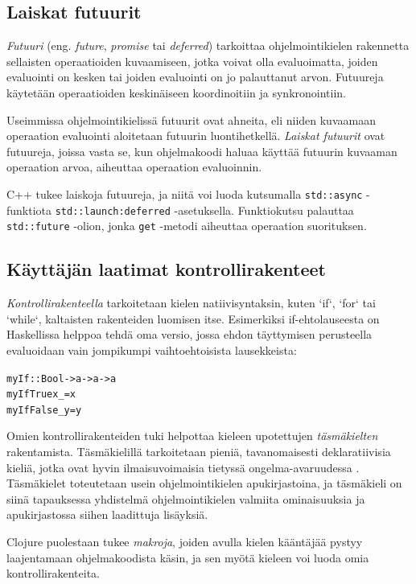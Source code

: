 \subsection{Laiskat futuurit}
\textit{Futuuri} (eng. \textit{future}, \textit{promise} tai \textit{deferred}) tarkoittaa ohjelmointikielen rakennetta sellaisten operaatioiden kuvaamiseen, jotka voivat olla evaluoimatta, joiden evaluointi on kesken tai joiden evaluointi on jo palauttanut arvon. Futuureja käytetään operaatioiden keskinäiseen koordinoitiin ja synkronointiin.

Useimmissa ohjelmointikielissä futuurit ovat ahneita, eli niiden kuvaamaan operaation evaluointi aloitetaan futuurin luontihetkellä. \textit{Laiskat futuurit} ovat futuureja, joissa vasta se, kun ohjelmakoodi haluaa käyttää futuurin kuvaaman operaation arvoa, aiheuttaa operaation evaluoinnin.

C++ tukee laiskoja futuureja, ja niitä voi luoda kutsumalla \verb!std::async! -funktiota \verb!std::launch:deferred! -asetuksella. Funktiokutsu palauttaa \verb!std::future! -olion, jonka \verb!get! -metodi aiheuttaa operaation suorituksen.

\subsection{Käyttäjän laatimat kontrollirakenteet}

\textit{Kontrollirakenteella} tarkoitetaan kielen natiivisyntaksin, kuten `if`, `for` tai `while`, kaltaisten rakenteiden luomisen itse. Esimerkiksi if-ehtolauseesta on Haskellissa helppoa tehdä oma versio, jossa ehdon täyttymisen perusteella evaluoidaan vain jompikumpi vaihtoehtoisista lausekkeista:

\begin{alltt}
myIf :: Bool -> a -> a -> a
myIf True  x _ = x
myIf False _ y = y
\end{alltt}

Omien kontrollirakenteiden tuki helpottaa kieleen upotettujen \textit{täsmäkielten} rakentamista. Täsmäkielillä tarkoitetaan pieniä, tavanomaisesti deklaratiivisia kieliä, jotka ovat hyvin ilmaisuvoimaisia tietyssä ongelma-avaruudessa \citep{van2000domain}. Täsmäkielet toteutetaan usein ohjelmointikielen apukirjastoina, ja täsmäkieli on siinä tapauksessa yhdistelmä ohjelmointikielen valmiita ominaisuuksia ja apukirjastossa siihen laadittuja lisäyksiä.

Clojure puolestaan tukee \textit{makroja}, joiden avulla kielen kääntäjää pystyy laajentamaan ohjelmakoodista käsin, ja sen myötä kieleen voi luoda omia kontrollirakenteita.

